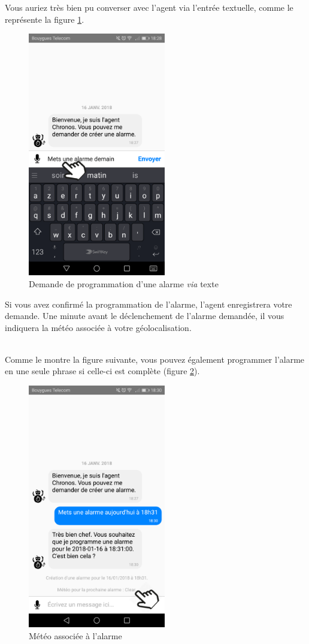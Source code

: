 Vous auriez très bien pu converser avec l'agent via l'entrée textuelle, comme le représente la figure \ref{F}.

\begin{figure}[H]
  \centering
  \includegraphics[width=6cm]{images/F.png}
  \caption{Demande de programmation d'une alarme \emph{via} texte}
  \label{F}
\end{figure}

Si vous avez confirmé la programmation de l'alarme, l'agent enregistrera votre demande. Une minute avant le déclenchement de l'alarme demandée, il vous indiquera la météo associée à votre géolocalisation. 

~\\\indent
Comme le montre la figure suivante, vous pouvez également programmer l'alarme en une seule phrase si celle-ci est complète (figure \ref{G}).

\begin{figure}[H]
  \centering
  \includegraphics[width=6cm]{images/G.png}
  \caption{Météo associée à l'alarme}
  \label{G}
\end{figure}

